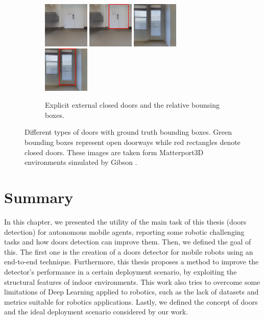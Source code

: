 \begin{figure}[h!]
	\begin{subfigure}[b]{\linewidth}
		\centering
		\includegraphics[width=0.24\textwidth]{images/explicitexternalclosed1.png}
		\hfill
		\includegraphics[width=0.24\textwidth]{images/explicitexternalclosed1boxed.png}
		\hfill
		\includegraphics[width=0.24\textwidth]{images/explicitexternalclosed2.png}
		\hfill
		\includegraphics[width=0.24\textwidth]{images/explicitexternalclosed2boxed.png}
		\caption{Explicit external closed doors and the relative bounsing boxes.}
	\end{subfigure}
	\caption{Different types of doors with ground truth bounding boxes. Green bounding boxes represent open doorways while red rectangles denote closed doors. These images are taken form Matterport3D \cite{matterport} environments simulated by Gibson \cite{gibson}.}
\end{figure}

\section{Summary}

In this chapter, we presented the utility of the main task of this thesis (doors detection) for autonomous mobile agents, reporting some robotic challenging tasks and how doors detection can improve them. Then, we defined the goal of this. The first one is the creation of a doors detector for mobile robots using an end-to-end technique. Furthermore, this thesis proposes a method to improve the detector's performance in a certain deployment scenario, by exploiting the structural features of indoor environments. This work also tries to overcome some limitations of Deep Learning applied to robotics, such as the lack of datasets and metrics suitable for robotics applications. Lastly, we defined the concept of doors and the ideal deployment scenario considered by our work.
